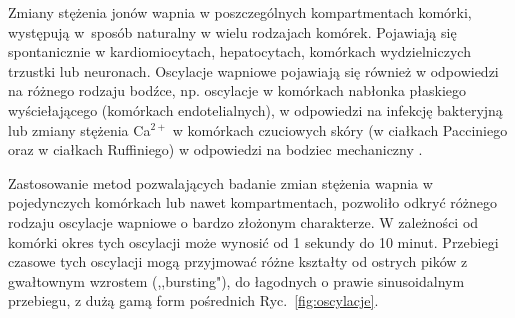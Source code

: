 Zmiany stężenia jonów wapnia w poszczególnych kompartmentach komórki, występują w~sposób naturalny w wielu rodzajach komórek. Pojawiają się spontanicznie w kardiomiocytach, hepatocytach, komórkach wydzielniczych trzustki lub neuronach. Oscylacje wapniowe pojawiają się również w odpowiedzi na różnego rodzaju bodźce, np. oscylacje w komórkach nabłonka płaskiego wyściełającego (komórkach endotelialnych), w odpowiedzi na infekcję bakteryjną lub  zmiany stężenia Ca$^{2+}$ w komórkach czuciowych skóry (w ciałkach Pacciniego oraz w ciałkach Ruffiniego) w odpowiedzi na bodziec mechaniczny \cite{Maeda1999, Vega1996}.

Zastosowanie metod pozwalających badanie zmian stężenia wapnia w pojedynczych komórkach lub nawet kompartmentach, pozwoliło odkryć różnego rodzaju oscylacje wapniowe o bardzo złożonym charakterze. W zależności od komórki okres tych oscylacji może wynosić od 1 sekundy do 10 minut. Przebiegi czasowe tych oscylacji mogą przyjmować różne kształty od ostrych pików z gwałtownym wzrostem (,,bursting"), do łagodnych o prawie  sinusoidalnym przebiegu, z dużą gamą form pośrednich Ryc.~\ref{fig:oscylacje}.

